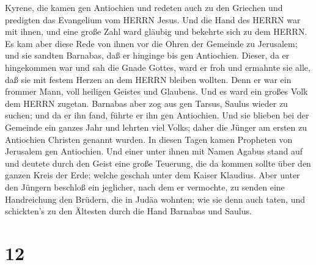 Kyrene, die kamen gen Antiochien und redeten auch zu den Griechen und
predigten das Evangelium vom HERRN Jesus.  Und die Hand des
HERRN war mit ihnen, und eine große Zahl ward gläubig und bekehrte sich
zu dem HERRN.  Es kam aber diese Rede von ihnen vor die
Ohren der Gemeinde zu Jerusalem; und sie sandten Barnabas, daß er
hinginge bis gen Antiochien.  Dieser, da er hingekommen war
und sah die Gnade Gottes, ward er froh und ermahnte sie alle, daß sie
mit festem Herzen an dem HERRN bleiben wollten.  Denn er
war ein frommer Mann, voll heiligen Geistes und Glaubens. Und es ward
ein großes Volk dem HERRN zugetan.  Barnabas aber zog aus
gen Tarsus, Saulus wieder zu suchen;  und da er ihn fand,
führte er ihn gen Antiochien. Und sie blieben bei der Gemeinde ein
ganzes Jahr und lehrten viel Volks; daher die Jünger am ersten zu
Antiochien Christen genannt wurden.  In diesen Tagen kamen
Propheten von Jerusalem gen Antiochien.  Und einer unter
ihnen mit Namen Agabus stand auf und deutete durch den Geist eine große
Teuerung, die da kommen sollte über den ganzen Kreis der Erde; welche
geschah unter dem Kaiser Klaudius.  Aber unter den Jüngern
beschloß ein jeglicher, nach dem er vermochte, zu senden eine
Handreichung den Brüdern, die in Judäa wohnten;  wie sie
denn auch taten, und schickten's zu den Ältesten durch die Hand Barnabas
und Saulus.

\hypertarget{section-11}{%
\section{12}\label{section-11}}


